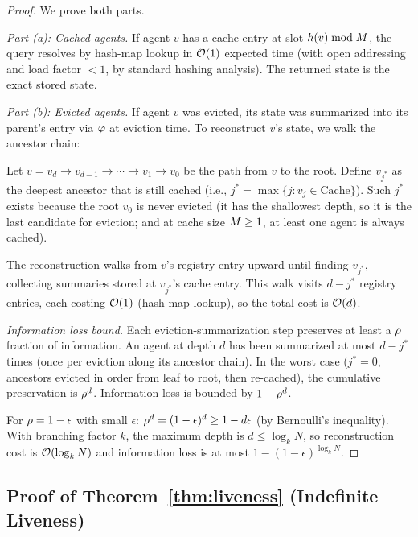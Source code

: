 \begin{proof}
We prove both parts.

\emph{Part (a): Cached agents.}  If agent $v$ has a cache entry at
slot $h(v) \bmod M$, the query resolves by hash-map lookup in
$\mathcal{O}(1)$ expected time (with open addressing and load factor
$< 1$, by standard hashing analysis).  The returned state is the
exact stored state.

\emph{Part (b): Evicted agents.}  If agent $v$ was evicted, its state
was summarized into its parent's entry via $\varphi$ at eviction
time.  To reconstruct $v$'s state, we walk the ancestor chain:

Let $v = v_d \to v_{d-1} \to \cdots \to v_1 \to v_0$ be the path from
$v$ to the root.  Define $v_{j^*}$ as the deepest ancestor that is
still cached (i.e., $j^* = \max\{j : v_j \in \mathrm{Cache}\}$).
Such $j^*$ exists because the root $v_0$ is never evicted (it has the
shallowest depth, so it is the last candidate for eviction; and at
cache size $M \geq 1$, at least one agent is always cached).

The reconstruction walks from $v$'s registry entry upward until
finding $v_{j^*}$, collecting summaries stored at $v_{j^*}$'s
cache entry.  This walk visits $d - j^*$ registry entries, each
costing $\mathcal{O}(1)$ (hash-map lookup), so the total cost is $\mathcal{O}(d)$.

\emph{Information loss bound.}  Each eviction-summarization step
preserves at least a $\rho$ fraction of information.  An agent
at depth $d$ has been summarized at most $d - j^*$ times (once per
eviction along its ancestor chain).  In the worst case ($j^* = 0$,
ancestors evicted in order from leaf to root, then re-cached), the
cumulative preservation is $\rho^{d}$.  Information loss is
bounded by $1 - \rho^{d}$.

For $\rho = 1 - \epsilon$ with small $\epsilon$:
$\rho^d = (1-\epsilon)^d \geq 1 - d\epsilon$
(by Bernoulli's inequality).  With branching factor $k$, the maximum
depth is $d \leq \log_k N$, so reconstruction cost is
$\mathcal{O}(\log_k N)$ and information loss is at most
$1 - (1-\epsilon)^{\log_k N}$.
\end{proof}


\subsection{Proof of Theorem~\ref{thm:liveness} (Indefinite Liveness)}
\label{sec:proof-liveness}

